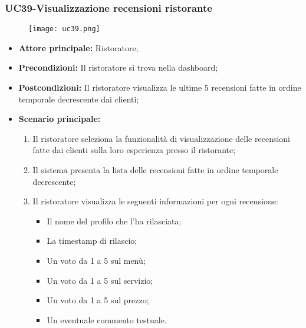 \subsubsection{UC39-Visualizzazione recensioni ristorante} %
\begin{figure}[h] \texttt{[image: uc39.png]} \end{figure}
\begin{itemize}
\item \textbf{Attore principale:} Ristoratore;
\item \textbf{Precondizioni:} Il ristoratore si trova nella dashboard;
\item \textbf{Postcondizioni:} Il ristoratore visualizza le ultime 5 recensioni fatte in ordine temporale decrescente dai clienti;
\item \textbf{Scenario principale:}
\begin{enumerate}
    \item Il ristoratore seleziona la funzionalità di visualizzazione delle recensioni fatte dai clienti sulla loro esperienza presso il ristorante;
    \item Il sistema presenta la lista delle recensioni fatte in ordine temporale decrescente;
    \item Il ristoratore visualizza le seguenti informazioni per ogni recensione:
    \begin{itemize}
        \item Il nome del profilo che l'ha rilasciata;
        \item La timestamp di rilascio;
        \item Un voto da 1 a 5 sul menù;
        \item Un voto da 1 a 5 sul servizio;
        \item Un voto da 1 a 5 sul prezzo;
        \item Un eventuale commento testuale.
    \end{itemize}
\end{enumerate}
\end{itemize}

